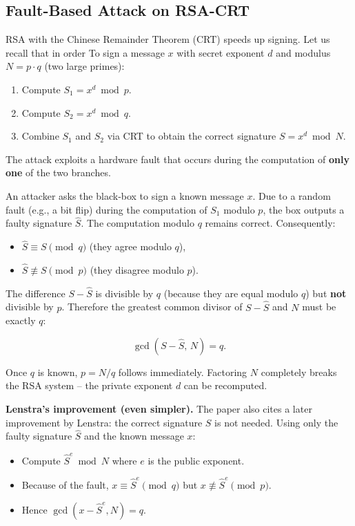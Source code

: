 \subsection{Fault-Based Attack on RSA-CRT}

RSA with the Chinese Remainder Theorem (CRT) speeds up signing. Let us recall that in order  To sign a message \(x\) with secret exponent \(d\) and modulus \(N = p \cdot q\) (two large primes):

\begin{enumerate}
    \item Compute \(S_1 = x^d \bmod p\).
    \item Compute \(S_2 = x^d \bmod q\).
    \item Combine \(S_1\) and \(S_2\) via CRT to obtain the correct signature \(S = x^d \bmod N\).
\end{enumerate}

The attack exploits a hardware fault that occurs during the computation of \textbf{only one} of the two branches.
 
An attacker asks the black‑box to sign a known message \(x\). Due to a random fault (e.g., a bit flip) during the computation of \(S_1\) modulo \(p\), the box outputs a faulty signature \(\hat{S}\). The computation modulo \(q\) remains correct. Consequently:

\begin{itemize}
    \item \(\hat{S} \equiv S \pmod{q}\) (they agree modulo \(q\)),
    \item \(\hat{S} \not\equiv S \pmod{p}\) (they disagree modulo \(p\)).
\end{itemize}

The difference \(S - \hat{S}\) is divisible by \(q\) (because they are equal modulo \(q\)) but \textbf{not} divisible by \(p\). Therefore the greatest common divisor of \(S - \hat{S}\) and \(N\) must be exactly \(q\):

\[
\gcd(S - \hat{S},\, N) = q.
\]

Once \(q\) is known, \(p = N / q\) follows immediately. Factoring \(N\) completely breaks the RSA system – the private exponent \(d\) can be recomputed.

\textbf{Lenstra's improvement (even simpler).}  
The paper also cites a later improvement by Lenstra: the correct signature \(S\) is not needed. Using only the faulty signature \(\hat{S}\) and the known message \(x\):

\begin{itemize}
    \item Compute \(\hat{S}^e \bmod N\) where \(e\) is the public exponent.
    \item Because of the fault, \(x \equiv \hat{S}^e \pmod{q}\) but \(x \not\equiv \hat{S}^e \pmod{p}\).
    \item Hence \(\gcd(x - \hat{S}^e, N) = q\).
\end{itemize}


